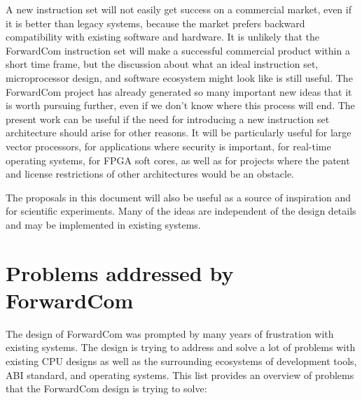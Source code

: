\documentclass[forwardcom.tex]{subfiles}
\begin{document}
A new instruction set will not easily get success on a commercial market, even if it is better than legacy systems, because the market prefers backward compatibility with existing software and hardware. It is unlikely that the ForwardCom instruction set will make a successful commercial product within a short time frame, but the discussion about what an ideal instruction set, microprocessor design, and software ecosystem might look like is still useful. The ForwardCom project has already generated so many important new ideas that it is worth pursuing further, even if we don't know where this process will end. The present work can be useful if the need for introducing a new instruction set architecture should arise for other reasons. It will be particularly useful for large vector processors, for applications where security is important, for real-time operating systems, for FPGA soft cores, as well as for projects where the patent and license restrictions of other architectures would be an obstacle.
\vspace{2mm}

The proposals in this document will also be useful as a source of inspiration and for scientific experiments. Many of the ideas are independent of the design details and may be implemented in existing systems.
\vspace{2mm}

\section{Problems addressed by ForwardCom}
The design of ForwardCom was prompted by many years of frustration with existing systems. The design is trying to address and solve a lot of problems with existing CPU designs as well as the surrounding ecosystems of development tools, ABI standard, and operating systems. This list provides an overview of problems that the ForwardCom design is trying to solve:
\vspace{2mm}
\end{document}
